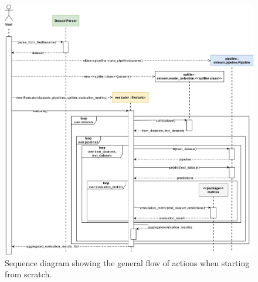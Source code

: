 \begin{figure}[ht]
    \centering
    \includegraphics[width=\textwidth]{gfx/general_sequence_diagram}
    \caption{Sequence diagram showing the general flow of actions when starting from scratch.}
    \label{fig:interfaces-general_sequence_diagram}
\end{figure}

